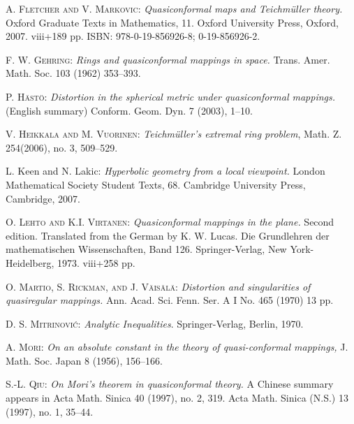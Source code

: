\documentclass[12pt,a4paper,leqno]{amsart}
\theoremstyle{plain}
\numberwithin{equation}{section}          %
\begin{document}
\begin{thebibliography}{AVV2}
\textsc{A. Fletcher and V. Markovic}: {\it  Quasiconformal maps and
Teichm\"uller theory.} Oxford Graduate Texts in Mathematics, 11.
Oxford University Press, Oxford, 2007. viii+189 pp. ISBN:
978-0-19-856926-8; 0-19-856926-2.

\textsc{F. W. Gehring}: {\it
Rings and quasiconformal mappings in space.}
Trans. Amer. Math. Soc. 103 (1962) 353--393.


\textsc{P. H\"ast\"o}: {\it
Distortion in the spherical metric under quasiconformal mappings.} (English summary)
Conform. Geom. Dyn. 7 (2003), 1--10.



 \textsc{V. Heikkala and M. Vuorinen}:
{\it Teichm\"uller's extremal ring problem},
Math. Z. 254(2006), no. 3, 509--529.


 {\sc L. Keen and N. Lakic:}
{\it Hyperbolic geometry from a local viewpoint.}
London Mathematical Society Student Texts, 68. Cambridge University
Press, Cambridge, 2007.



 \textsc{O. Lehto and K.I. Virtanen}:
{\it Quasiconformal mappings in the plane.} Second edition.
Translated from the German by K. W. Lucas.
Die Grundlehren der mathematischen Wissenschaften, Band 126.
Springer-Verlag, New York-Heidelberg, 1973. viii+258 pp.




  \textsc{O. Martio, S. Rickman, and J. V\"ais\"al\"a}:
{\it Distortion and singularities of quasiregular mappings.}
Ann. Acad. Sci. Fenn. Ser. A I No. 465 (1970) 13 pp.



 \textsc{D. S. Mitrinovi\'c:}
{\it Analytic Inequalities}. Springer-Verlag, Berlin, 1970.


 \textsc{A. Mori}:
{\it On an absolute constant in the theory of quasi-conformal
mappings,} J. Math. Soc. Japan 8 (1956), 156--166.

 \textsc{S.-L. Qiu}: {\it On Mori's theorem in quasiconformal theory.}
A Chinese summary appears in Acta Math. Sinica 40 (1997), no. 2, 319.
Acta Math. Sinica (N.S.) 13 (1997), no. 1, 35--44.





\end{thebibliography}
\end{document}
